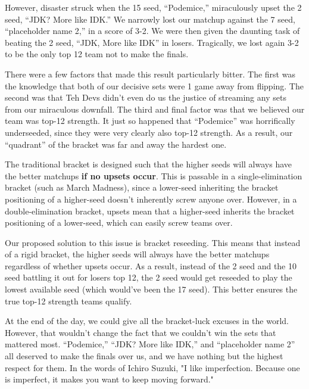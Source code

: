 \medskip

However, disaster struck when the 15 seed, ``Podemice,'' miraculously upset the 2 seed, ``JDK? More like IDK.'' We narrowly lost our matchup against the 7 seed, ``placeholder name 2,'' in a score of 3-2. We were then given the daunting task of beating the 2 seed, ``JDK, More like IDK'' in losers. Tragically, we lost again 3-2 to be the only top 12 team not to make the finals.

\medskip

There were a few factors that made this result particularly bitter. The first was the knowledge that both of our decisive sets were 1 game away from flipping. The second was that Teh Devs didn't even do us the justice of streaming any sets from our miraculous downfall. The third and final factor was that we believed our team was top-12 strength. It just so happened that ``Podemice'' was horrifically underseeded, since they were very clearly also top-12 strength. As a result, our ``quadrant'' of the bracket was far and away the hardest one.

\medskip

The traditional bracket is designed such that the higher seeds will always have the better matchups \textbf{if no upsets occur}. This is passable in a single-elimination bracket (such as March Madness), since a lower-seed inheriting the bracket positioning of a higher-seed doesn't inherently screw anyone over. However, in a double-elimination bracket, upsets mean that a higher-seed inherits the bracket positioning of a lower-seed, which can easily screw teams over.

\medskip

Our proposed solution to this issue is bracket reseeding. This means that instead of a rigid bracket, the higher seeds will always have the better matchups regardless of whether upsets occur. As a result, instead of the 2 seed and the 10 seed battling it out for losers top 12, the 2 seed would get reseeded to play the lowest available seed (which would've been the 17 seed). This better ensures the true top-12 strength teams qualify.

\medskip

At the end of the day, we could give all the bracket-luck excuses in the world. However, that wouldn't change the fact that we couldn't win the sets that mattered most. ``Podemice,'' ``JDK? More like IDK,'' and ``placeholder name 2'' all deserved to make the finals over us, and we have nothing but the highest respect for them. In the words of Ichiro Suzuki, "I like imperfection. Because one is imperfect, it makes you want to keep moving forward."